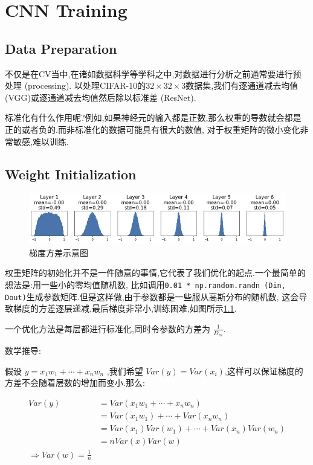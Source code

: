 \chapter{CNN Training}

\section{Data Preparation}

不仅是在CV当中,在诸如数据科学等学科之中,对数据进行分析之前通常要进行预处理 (processing).
以处理CIFAR-10的$32\times32\times3$数据集,我们有逐通道减去均值 (VGG)或逐通道减去均值然后除以标准差 (ResNet).

标准化有什么作用呢?例如,如果神经元的输入都是正数,那么权重的导数就会都是正的或者负的.而非标准化的数据可能具有很大的数值,
对于权重矩阵的微小变化非常敏感,难以训练.

\section{Weight Initialization}

\begin{figure}[htbp]
	\includegraphics[scale=0.55]{figures/grad_var.png}
	\caption{梯度方差示意图}
	\label{grad_var}
\end{figure}

权重矩阵的初始化并不是一件随意的事情,它代表了我们优化的起点.一个最简单的想法是:用一些小的零均值随机数,
比如调用\texttt{0.01 * np.random.randn (Din, Dout)}生成参数矩阵.但是这样做,由于参数都是一些服从高斯分布的随机数,
这会导致梯度的方差逐层递减,最后梯度非常小,训练困难,如图所示\ref{grad_var}.

一个优化方法是每层都进行标准化,同时令参数的方差为 $\frac{1}{D_{in}}$.

数学推导:

假设 $y=x_1w_1+\cdots+x_nw_n$ ,我们希望 $Var(y)=Var(x_i)$,这样可以保证梯度的方差不会随着层数的增加而变小.那么:

\begin{equation}
	\begin{aligned}
		Var(y) &= Var(x_1w_1+\cdots+x_nw_n)
		\\
		&= Var(x_1w_1)+\cdots+Var (x_nw_n)
		\\
		&= Var(x_1)Var(w_1)+\cdots+Var(x_n)Var(w_n)
		\\
		&= n Var(x)Var(w)
		\\
		\Rightarrow Var(w)=\frac{1}{n}
	\end{aligned}
\end{equation}

